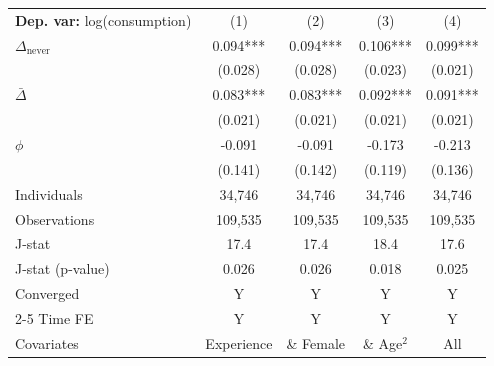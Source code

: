 \begin{tabular}{l cccc} \toprule  \textbf{Dep. var:}  log(consumption) 
                    &\multicolumn{1}{c}{(1)}   &\multicolumn{1}{c}{(2)}   &\multicolumn{1}{c}{(3)}   &\multicolumn{1}{c}{(4)}   \\

\addlinespace
$\Delta_{\text{never}}$&       0.094***&       0.094***&       0.106***&       0.099***\\
                    &     (0.028)   &     (0.028)   &     (0.023)   &     (0.021)   \\

\addlinespace
$\bar{\Delta}$      &       0.083***&       0.083***&       0.092***&       0.091***\\
                    &     (0.021)   &     (0.021)   &     (0.021)   &     (0.021)   \\

\addlinespace
$\phi$              &      -0.091   &      -0.091   &      -0.173   &      -0.213   \\
                    &     (0.141)   &     (0.142)   &     (0.119)   &     (0.136)   \\
\addlinespace
Individuals         &      34,746   &      34,746   &      34,746   &      34,746   \\
Observations        &     109,535   &     109,535   &     109,535   &     109,535   \\
J-stat              &        17.4   &        17.4   &        18.4   &        17.6   \\
J-stat (p-value)    &       0.026   &       0.026   &       0.018   &       0.025   \\
Converged           &           Y   &           Y   &           Y   &           Y   \\
\cmidrule{2-5} Time FE & Y & Y & Y & Y \\ Covariates & Experience & \& Female & \& Age$^2$ & All \\ \bottomrule \end{tabular}
